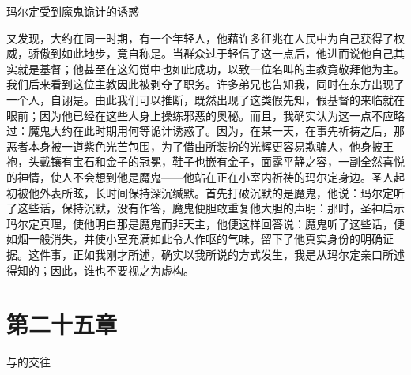 玛尔定受到魔鬼诡计的诱惑\par

又发现，大约在同一时期，有一个年轻人，他藉许多征兆在人民中为自己获得了权威，骄傲到如此地步，竟自称是。当群众过于轻信了这一点后，他进而说他自己其实就是基督；他甚至在这幻觉中也如此成功，以致一位名叫的主教竟敬拜他为主。我们后来看到这位主教因此被剥夺了职务。许多弟兄也告知我，同时在东方出现了一个人，自诩是。由此我们可以推断，既然出现了这类假先知，假基督的来临就在眼前；因为他已经在这些人身上操练邪恶的奥秘。而且，我确实认为这一点不应略过：魔鬼大约在此时期用何等诡计诱惑了。因为，在某一天，在事先祈祷之后，那恶者本身被一道紫色光芒包围，为了借由所装扮的光辉更容易欺骗人，他身披王袍，头戴镶有宝石和金子的冠冕，鞋子也嵌有金子，面露平静之容，一副全然喜悦的神情，使人不会想到他是魔鬼——他站在正在小室内祈祷的玛尔定身边。圣人起初被他外表所眩，长时间保持深沉缄默。首先打破沉默的是魔鬼，他说：玛尔定听了这些话，保持沉默，没有作答，魔鬼便胆敢重复他大胆的声明：那时，圣神启示玛尔定真理，使他明白那是魔鬼而非天主，他便这样回答说：魔鬼听了这些话，便如烟一般消失，并使小室充满如此令人作呕的气味，留下了他真实身份的明确证据。这件事，正如我刚才所述，确实以我所说的方式发生，我是从玛尔定亲口所述得知的；因此，谁也不要视之为虚构。\par


\section{第二十五章}

与的交往\par

